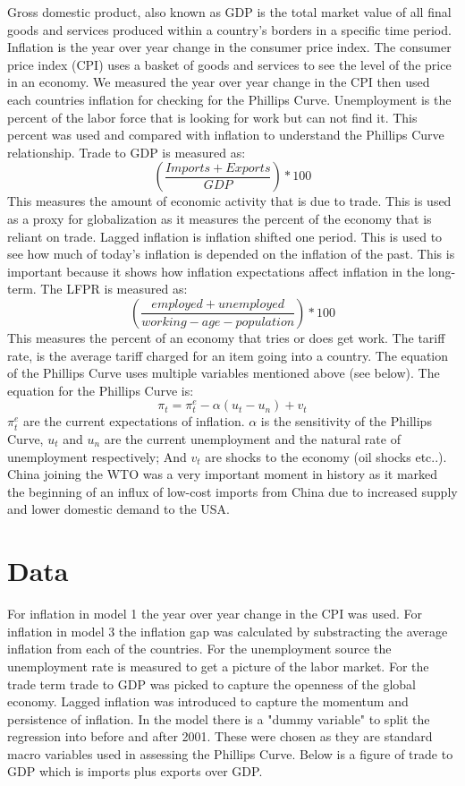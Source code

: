 \documentclass{article}
\begin{document}
Gross domestic product, also known as GDP is the total market value of all final goods and services produced within a country's borders in a specific time period\autocite{FRED_GDP}. Inflation is the year over year change in the consumer price index. The consumer price index (CPI) uses a basket of goods and services to see the level of the price in an economy\autocite{FRED_CPI, bls_cpi}. We measured the year over year change in the CPI then used each countries inflation for checking for the Phillips Curve. Unemployment is the percent of the labor force that is looking for work but can not find it\autocite{FRED_UNRATE, econosphere_lfpr}. This percent was used and compared with inflation to understand the Phillips Curve relationship. Trade to GDP is measured as:
$$(\frac{Imports+Exports}{GDP})*100$$
This measures the amount of economic activity that is due to trade\autocite{FRED_EXPGS, FRED_IMPGS}. This is used as a proxy for globalization as it measures the percent of the economy that is reliant on trade\autocite{gravel_trade}. Lagged inflation is inflation shifted one period. This is used to see how much of today's inflation is depended on the inflation of the past. This is important because it shows how inflation expectations affect inflation in the long-term. The LFPR is measured as:
$$(\frac{employed+unemployed}{working-age-population})*100$$
This measures the percent of an economy that tries or does get work. The tariff rate, is the average tariff charged for an item going into a country. The equation of the Phillips Curve uses multiple variables mentioned above (see below). The equation for the Phillips Curve is:
$$
\pi_t=\pi^e_t-\alpha(u_t-u_n)+v_t
$$
$\pi^e_t$ are the current expectations of inflation. $\alpha$ is the sensitivity of the Phillips Curve, $u_t$ and $u_n$ are the current unemployment and the natural rate of unemployment respectively; And $v_t$ are shocks to the economy (oil shocks etc..). China joining the WTO was a very important moment in history as it marked the beginning of an influx of low-cost imports from China due to increased supply and lower domestic demand to the USA.
\section{Data}

For inflation in model 1 the year over year change in the CPI was used. For inflation in model 3 the inflation gap was calculated by substracting the average inflation from each of the countries. For the unemployment source the unemployment rate is measured to get a picture of the labor market. For the trade term trade to GDP was picked to capture the openness of the global economy. Lagged inflation was introduced to capture the momentum and persistence of inflation. In the model there is a "dummy variable" to split the regression into before and after 2001. These were chosen as they are standard macro variables used in assessing the Phillips Curve. Below is a figure of trade to GDP which is imports plus exports over GDP.
\end{document}
